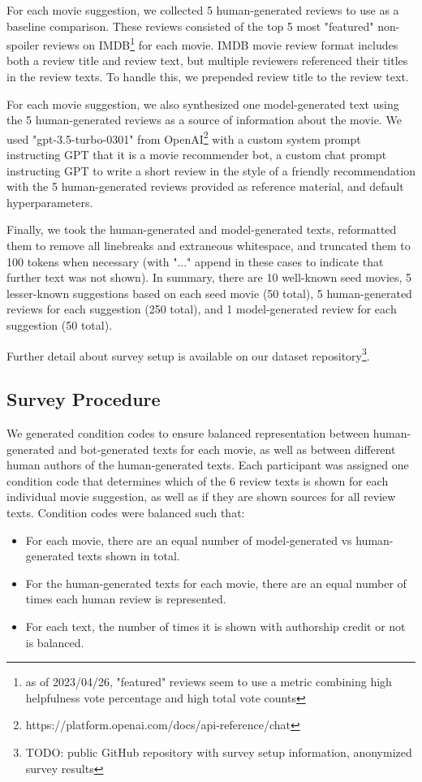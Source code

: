 For each movie suggestion, we collected 5 human-generated reviews to use as a baseline comparison.
These reviews consisted of the top 5 most "featured" non-spoiler reviews on IMDB\footnote{as of 2023/04/26, "featured" reviews seem to use a metric combining high helpfulness vote percentage and high total vote counts} for each movie.
IMDB movie review format includes both a review title and review text, but multiple reviewers referenced their titles in the review texts.
To handle this, we prepended review title to the review text.

For each movie suggestion, we also synthesized one model-generated text using the 5 human-generated reviews as a source of information about the movie.
We used "gpt-3.5-turbo-0301" from OpenAI\footnote{https://platform.openai.com/docs/api-reference/chat} with a custom system prompt instructing GPT that it is a movie recommender bot, a custom chat prompt instructing GPT to write a short review in the style of a friendly recommendation with the 5 human-generated reviews provided as reference material, and default hyperparameters.

Finally, we took the human-generated and model-generated texts, reformatted them to remove all linebreaks and extraneous whitespace, and truncated them to 100 tokens when necessary (with "..." append in these cases to indicate that further text was not shown).
In summary, there are 10 well-known seed movies, 5 lesser-known suggestions based on each seed movie (50 total), 5 human-generated reviews for each suggestion (250 total), and 1 model-generated review for each suggestion (50 total).

Further detail about survey setup is available on our dataset repository\footnote{TODO: public GitHub repository with survey setup information, anonymized survey results}.

\subsection{Survey Procedure}

We generated condition codes to ensure balanced representation between human-generated and bot-generated texts for each movie, as well as between different human authors of the human-generated texts.
Each participant was assigned one condition code that determines which of the 6 review texts is shown for each individual movie suggestion, as well as if they are shown sources for all review texts.
Condition codes were balanced such that:
\begin{itemize}
    \item For each movie, there are an equal number of model-generated vs human-generated texts shown in total.
    \item For the human-generated texts for each movie, there are an equal number of times each human review is represented.
    \item For each text, the number of times it is shown with authorship credit or not is balanced.
\end{itemize}

